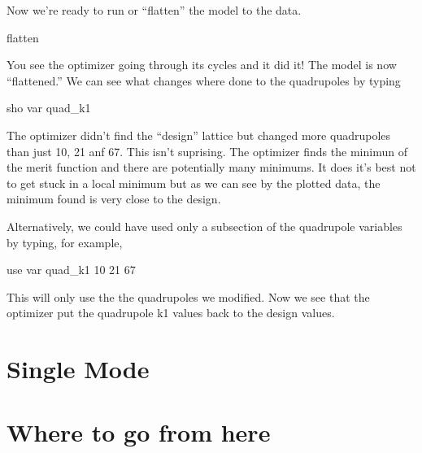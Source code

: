 \documentclass{report}
\begin{document}
Now we're ready to run or ``flatten'' the model to the data.
\begin{example}
  flatten
\end{example}
You see the optimizer going through its cycles and it did it! The model is now
``flattened.'' We can see what changes where done to the quadrupoles by typing
\begin{example}
  sho var quad\_k1
\end{example}
The optimizer didn't find the ``design'' lattice but changed more quadrupoles
than just 10, 21 anf 67. This isn't suprising. The optimizer finds the minimun
of the merit function and there are potentially many minimums. It does it's best
not to get stuck in a local minimum but as we can see by the plotted data, the
minimum found is very close to the design.

Alternatively, we could have used only a subsection of the quadrupole variables
by typing, for example,
\begin{example}
  use var quad\_k1 10 21 67
\end{example}
This will only use the the quadrupoles we modified. Now we see that the
optimizer put the quadrupole k1 values back to the design values.

\chapter{Single Mode}
\label{c:single_mode}

\chapter{Where to go from here}
\label{c:where_to_go}
\end{document}
